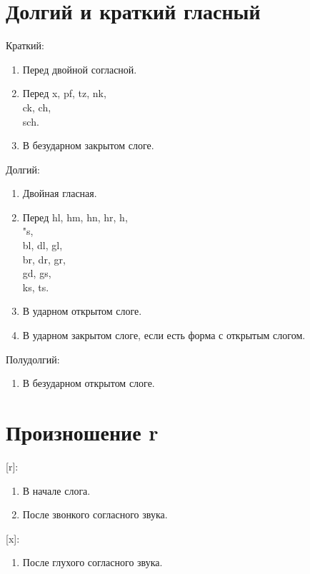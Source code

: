 \documentclass[oneside]{book}
\begin{document}
	\section{Долгий и краткий гласный}
	Краткий:
	\begin{enumerate}
		\item Перед двойной согласной.

		\item Перед x, pf, tz, nk, \\
		ck, ch, \\
		sch.

		\item В безударном закрытом слоге.
	\end{enumerate}

	Долгий:
	\begin{enumerate}
		\item Двойная гласная.

		\item Перед hl, hm, hn, hr, h, \\
		"s, \\
		bl, dl, gl, \\
		br, dr, gr, \\
		gd, gs, \\
		ks, ts.

		\item В ударном открытом слоге.

		\item В ударном закрытом слоге, если
		есть форма с открытым слогом.
	\end{enumerate}

	Полудолгий:
	\begin{enumerate}
		\item В безударном открытом слоге.
	\end{enumerate}

	\section{Произношение r}
	[r]:
	\begin{enumerate}
		\item В начале слога.
		\item После звонкого согласного звука.
	\end{enumerate}

	[x]:
	\begin{enumerate}
		\item После глухого согласного звука.
	\end{enumerate}
\end{document}
